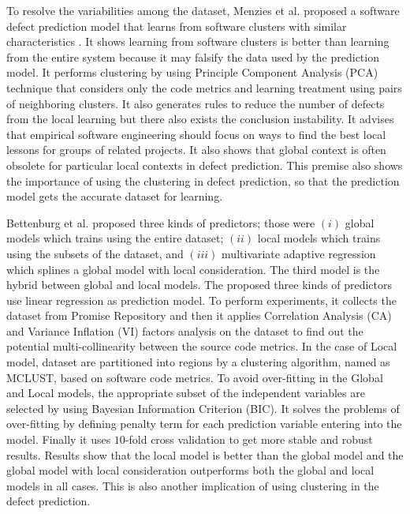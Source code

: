 \documentclass[12pt]{report}
\begin{document}
 
To resolve the variabilities among the dataset, Menzies et al. proposed a software defect prediction model that learns from software clusters with similar characteristics \cite{menzies2013local,menzies2011local}. It shows learning from software clusters is better than learning from the entire system because it may falsify the data used by the prediction model. It performs clustering by using Principle Component Analysis (PCA) technique that considers only the code metrics and learning treatment using pairs of neighboring clusters. It also generates rules to reduce the number of defects from the local learning but there also exists the conclusion instability. It advises that empirical software engineering should focus on ways to find the best local lessons for groups of related projects. It also shows that global context is often obsolete for particular local contexts in defect prediction. This premise also shows the importance of using the clustering in defect prediction, so that the prediction model gets the accurate dataset for learning.

Bettenburg et al. \cite{bettenburg2012think} proposed three kinds of predictors; those were $(i)$ global models which trains using the entire dataset; $(ii)$ local models which trains using the subsets of the dataset, and $(iii)$ multivariate adaptive regression which splines a global model with local consideration. The third model is the hybrid between global and local models. The proposed three kinds of predictors use linear regression as prediction model. To perform experiments, it collects the dataset from Promise Repository \cite{promise12} and then it applies Correlation Analysis (CA) and Variance Inflation (VI) factors analysis on the dataset to find out the potential multi-collinearity between the source code metrics. In the case of Local model, dataset are partitioned into regions by a clustering algorithm, named as MCLUST, based on software code metrics. To avoid over-fitting in the Global and Local models, the appropriate subset of the independent variables are selected by using Bayesian Information Criterion (BIC). It solves the problems of over-fitting by defining penalty term for each prediction variable entering into the model. Finally it uses $10$-fold cross validation to get more stable and robust results. Results show that the local model is better than the global model and the global model with local consideration outperforms both the global and local models in all cases. This is also another implication of using clustering in the defect prediction. 
 
\end{document}
